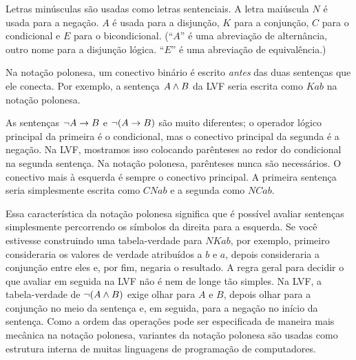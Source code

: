 Letras minúsculas são usadas como letras sentenciais. A letra maiúscula $N$ é usada para a negação. $A$ é usada para a disjunção, $K$ para a conjunção, $C$ para o condicional e $E$ para o bicondicional. (\textquotedblleft $A$\textquotedblright{} é uma abreviação de alternância, outro nome para a disjunção lógica. \textquotedblleft $E$\textquotedblright{} é uma abreviação de equivalência.)

Na notação polonesa, um conectivo binário é escrito \emph{antes} das duas sentenças que ele conecta. Por exemplo, a sentença $A\wedge B$ da LVF seria escrita como $Kab$ na notação polonesa.

As sentenças $\neg A\rightarrow B$ e $\neg (A\rightarrow B)$ são muito diferentes; o operador lógico principal da primeira é o condicional, mas o conectivo principal da segunda é a negação. Na LVF, mostramos isso colocando parênteses ao redor do condicional na segunda sentença. Na notação polonesa, parênteses nunca são necessários. O conectivo mais à esquerda é sempre o conectivo principal. A primeira sentença seria simplesmente escrita como $CNab$ e a segunda como $NCab$.

Essa característica da notação polonesa significa que é possível avaliar sentenças simplesmente percorrendo os símbolos da direita para a esquerda. Se você estivesse construindo uma tabela-verdade para $NKab$, por exemplo, primeiro consideraria os valores de verdade atribuídos a $b$ e $a$, depois consideraria a conjunção entre eles e, por fim, negaria o resultado. A regra geral para decidir o que avaliar em seguida na LVF não é nem de longe tão simples. Na LVF, a tabela-verdade de $\neg(A\wedge B)$ exige olhar para $A$ e $B$, depois olhar para a conjunção no meio da sentença e, em seguida, para a negação no início da sentença. Como a ordem das operações pode ser especificada de maneira mais mecânica na notação polonesa, variantes da notação polonesa são usadas como estrutura interna de muitas linguagens de programação de computadores.
